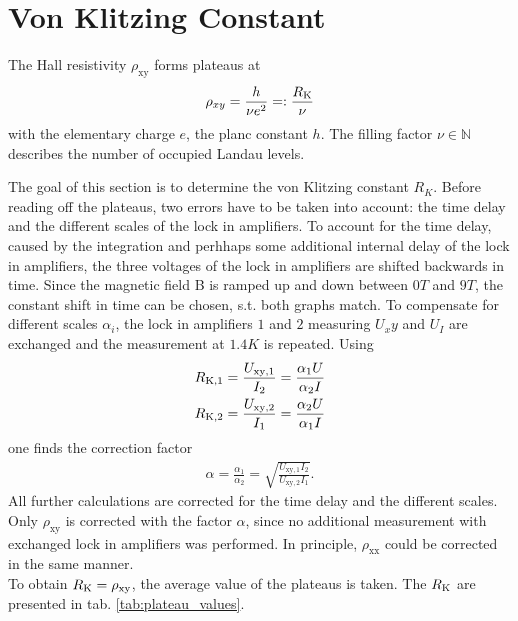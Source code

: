 \section{Von Klitzing Constant}

The Hall resistivity $\rho_{\text{xy}}$ forms plateaus at
\begin{align}
    \rho_{xy} = \frac{h}{\nu e^2} =: \frac{R_\text K}{\nu}
\end{align}
with the elementary charge $e$, the planc constant $h$. 
The filling factor $\nu \in \mathbb N$ describes the number of occupied Landau levels.

The goal of this section is to determine the von Klitzing constant $R_K$.
Before reading off the plateaus, two errors have to be taken into account:
the time delay and the different scales of the lock in amplifiers.
To account for the time delay, 
caused by the integration and perhhaps some additional internal delay of the lock in amplifiers,
the three voltages of the lock in amplifiers are shifted backwards in time.
Since the magnetic field B is ramped up and down between $0T$ and $9T$, 
the constant shift in time can be chosen, s.t. both graphs match.
To compensate for different scales $\alpha_i$, 
the lock in amplifiers $1$ and $2$ measuring $U_xy$ and $U_I$ are exchanged and the measurement at $1.4K$ is repeated.
Using
\begin{align}
    R_{\text K,1} = \frac{U_{\text{xy}, 1}}{I_2} = \frac{\alpha_1 U}{\alpha_2 I}\\
    R_{\text K,2} = \frac{U_{\text{xy}, 2}}{I_1} = \frac{\alpha_2 U}{\alpha_1 I}
\end{align}
one finds the correction factor
\begin{align}
    \alpha = \frac{\alpha_1}{\alpha_2} = \sqrt{\frac{U_{\text{xy},1}I_2}{U_{\text{xy}, 2}I_1}}. 
\end{align}
All further calculations are corrected for the time delay and the different scales.
Only $\rho_{\text{xy}}$ is corrected with the factor $\alpha$, 
since no additional measurement with exchanged lock in amplifiers was performed.
In principle, $\rho_{\text{xx}}$ could be corrected in the same manner.
\\
To obtain $R_\text K = \rho_{\text{xy}}$, the average value of the plateaus is taken. 
The $R_\text K$ are presented in tab. \ref{tab:plateau_values}.
